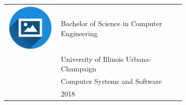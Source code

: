 \documentclass{article}
\begin{document}
\begin{paracol}{2}
 \begin{tabular}{@{}cp{0.7\linewidth}}
      \begin{minipage}{0.05\linewidth}
        \includegraphics[width=\linewidth]{picon.png}
      \end{minipage} & \vspace{-12pt}
      {\color{sidetext} {{Bachelor of Science in Computer Engineering}}} \\[-6pt]
      & {{University of Illinois Urbana-Champaign}} \\
      & {{Computer Systems and Software}} \\
      & {{2018}} 
    \end{tabular}



\end{paracol}
\end{document}
